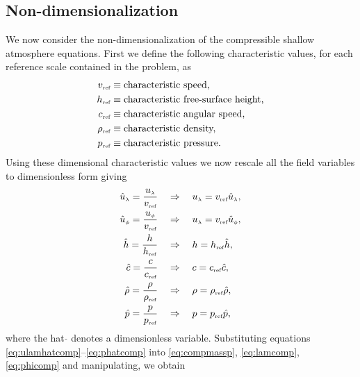\subsection{Non-dimensionalization}
We now consider the non-dimensionalization of the compressible shallow atmosphere equations. First we define the following characteristic values, for each reference scale contained in the problem, as
\begin{align*}
v_{\mbox{\tiny ref}} & \equiv \mbox{characteristic speed,}\\
h_{\mbox{\tiny ref}} & \equiv \mbox{characteristic free-surface height,} \\
c_{\mbox{\tiny ref}} & \equiv \mbox{characteristic angular speed,} \\
\rho_{\mbox{\tiny ref}} & \equiv \mbox{characteristic density,} \\
p_{\mbox{\tiny ref}} & \equiv \mbox{characteristic pressure.}
\end{align*}
Using these dimensional characteristic values we now rescale all the field variables to dimensionless form giving
\begin{align}
\hat{u}_{\scriptscriptstyle \lambda}=\frac{{u_{\scriptscriptstyle \lambda}}}{v_{\mbox{\tiny ref}}} \quad & \Rightarrow \quad {\ensuremath{u_{\scriptscriptstyle \lambda}}} = v_{\mbox{\tiny ref}} \hat{u}_{\scriptscriptstyle \lambda}, \label{eq:ulamhatcomp}\\
\hat{u}_{\scriptscriptstyle \phi}=\frac{{u_{\scriptscriptstyle \phi}}}{v_{\mbox{\tiny ref}}} \quad & \Rightarrow \quad {\ensuremath{u_{\scriptscriptstyle \lambda}}} = v_{\mbox{\tiny ref}} \hat{u}_{\scriptscriptstyle \phi}, \label{eq:uphihatcomp}\\
\hat{h}=\frac{h}{h_{\mbox{\tiny ref}}} \quad & \Rightarrow \quad h = h_{\mbox{\tiny ref}} \hat{h}, \label{eq:hhatcomp}\\
\hat{c}=\frac{c}{c_{\mbox{\tiny ref}}} \quad & \Rightarrow \quad c = c_{\mbox{\tiny ref}} \hat{c}, \label{eq:chatcomp}\\
\hat{\rho}=\frac{\rho}{\rho_{\mbox{\tiny ref}}} \quad & \Rightarrow \quad \rho = \rho_{\mbox{\tiny ref}} \hat{\rho}, \label{eq:rhohatcomp}\\
\hat{p}=\frac{p}{p_{\mbox{\tiny ref}}} \quad & \Rightarrow \quad p = p_{\mbox{\tiny ref}} \hat{p}, \label{eq:phatcomp}
\end{align}
where the hat $\hat{}$ denotes a dimensionless variable. Substituting equations \eqref{eq:ulamhatcomp}--\eqref{eq:phatcomp} into \eqref{eq:compmassp}, \eqref{eq:lamcomp},  \eqref{eq:phicomp} and manipulating, we obtain

